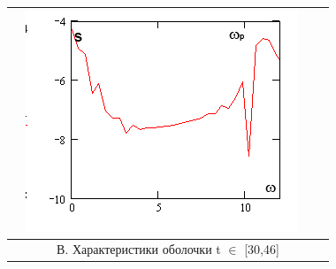 \documentclass[12pt,letterpaper]{extreport}
\begin{document}
\begin{table}[H]
{\begin{tabular}{|c|c|c|c|}
	&
	\includegraphics[scale=1]{a4} 
\\
\hline
\multicolumn{4}{|c|}{В. Характеристики оболочки t $\in$ [30,46]}\\


\end{tabular}}
\end{table}
\end{document}
